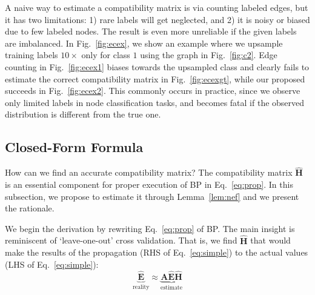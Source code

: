 A naive way to estimate a compatibility matrix is via counting labeled edges, but it has two limitations: 
1) rare labels will get neglected, and 
2) it is noisy or biased due to few labeled nodes.
The result is even more unreliable if the given labels are imbalanced.
In Fig.~\ref{fig:ecex}, we show an example where we upsample training labels $10\times$ only for class $1$ using the graph in Fig.~\ref{fig:c2}.
Edge counting in Fig.~\ref{fig:ecex1} biases towards the upsampled class and clearly fails to estimate the correct compatibility matrix in Fig.~\ref{fig:ecexgt}, while our proposed \methodest succeeds in Fig.~\ref{fig:ecex2}.
This commonly occurs in practice, since we observe only limited labels in node classification tasks, and becomes fatal if the observed distribution is different from the true one.

\subsection{Closed-Form Formula} \label{ssec:comp}
How can we find an accurate compatibility matrix?
The compatibility matrix $\hat{{\boldsymbol H}}$ is an essential component for proper execution of BP in Eq.~\ref{eq:prop}.
In this subsection, we propose to estimate it through Lemma~\ref{lem:nef} and we present the rationale.

We begin the derivation by rewriting Eq.~\ref{eq:prop} of BP.
The main insight is reminiscent of `leave-one-out' cross validation.
That is, we find $\hat{{\boldsymbol H}}$ that would make the results of the propagation (RHS of Eq.~\ref{eq:simple})
to the actual values (LHS  of Eq.~\ref{eq:simple}):
\begin{equation} \label{eq:simple}
\underbrace{\hat{{\boldsymbol E}}}_\text{reality} \approx
\underbrace{
{\boldsymbol A}\hat{{\boldsymbol E}}\hat{{\boldsymbol H}} }_\text{estimate}
\end{equation}


